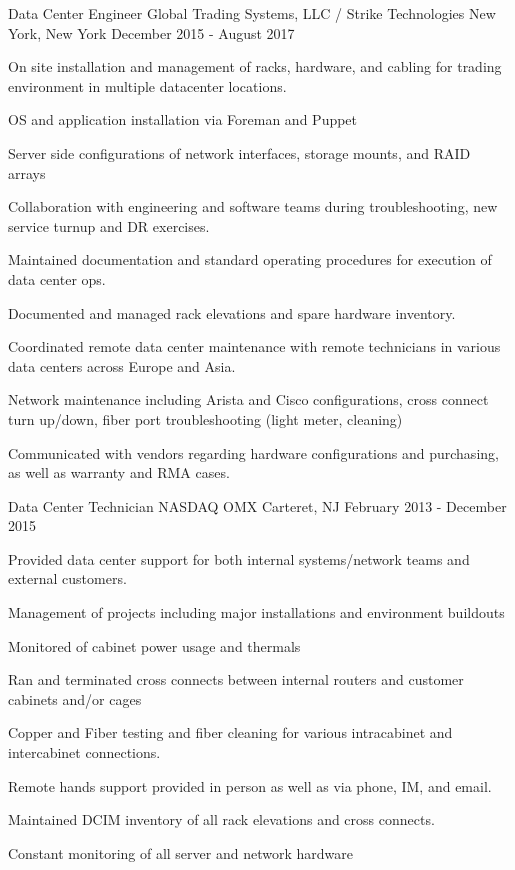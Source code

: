 \begin{cventries}
	\cventry
	{Data Center Engineer}
	{Global Trading Systems, LLC / Strike Technologies}
	{New York, New York}
	{December 2015 - August 2017}
	{
		\begin{cvitems}
		\item {On site installation and management of racks, hardware, and cabling for trading environment in multiple datacenter locations.}
		\item {OS and application installation via Foreman and Puppet}
		\item {Server side configurations of network interfaces, storage mounts, and RAID arrays}
		\item {Collaboration with engineering and software teams during troubleshooting, new service turnup and DR exercises.}
		\item {Maintained documentation and standard operating procedures for execution of data center ops.}
		\item {Documented and managed rack elevations and spare hardware inventory.}
		\item {Coordinated remote data center maintenance with remote technicians in various data centers across Europe and Asia.}
		\item {Network maintenance including Arista and Cisco configurations, cross connect turn up/down, fiber port troubleshooting (light meter, cleaning)}
  		\item {Communicated with vendors regarding hardware configurations and purchasing, as well as warranty and RMA cases.}
		\end{cvitems}
	}


	\cventry
	{Data Center Technician}
	{NASDAQ OMX}
	{Carteret, NJ}
	{February 2013 - December 2015}
	{
		\begin{cvitems}
		\item {Provided data center support for both internal systems/network teams and external customers.}
		\item {Management of projects including major installations and environment buildouts}
  		\item {Monitored of cabinet power usage and thermals}
		\item {Ran and terminated cross connects between internal routers and customer cabinets and/or cages}
		\item {Copper and Fiber testing and fiber cleaning for various intracabinet and intercabinet connections.}
		\item {Remote hands support provided in person as well as via phone, IM, and email.}
		\item {Maintained DCIM inventory of all rack elevations and cross connects.}
		\item {Constant monitoring of all server and network hardware}
		\end{cvitems}
	}

\end{cventries}
